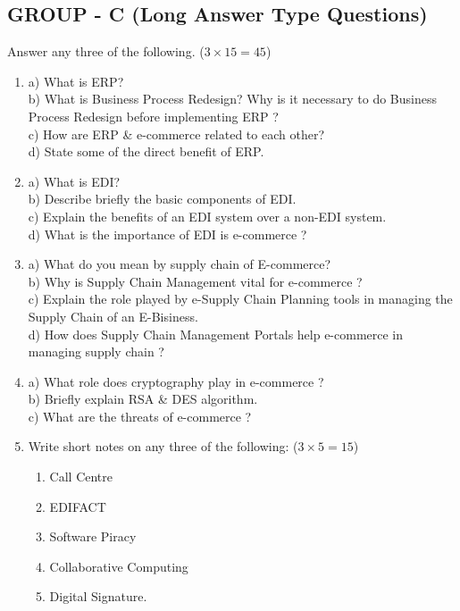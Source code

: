 \documentclass{article}
\begin{document}
\subsection*{GROUP - C (Long Answer Type Questions)}
Answer any three of the following. ($3 \times 15 = 45$)
\begin{enumerate}
    \item[7.] 
    a) What is ERP? \\
    b) What is Business Process Redesign? Why is it necessary to do Business Process Redesign before implementing ERP ? \\
    c) How are ERP \& e-commerce related to each other? \\
    d) State some of the direct benefit of ERP.
    \item[8.] 
    a) What is EDI? \\
    b) Describe briefly the basic components of EDI. \\
    c) Explain the benefits of an EDI system over a non-EDI system. \\
    d) What is the importance of EDI is e-commerce ?
    \item[9.] 
    a) What do you mean by supply chain of E-commerce? \\
    b) Why is Supply Chain Management vital for e-commerce ? \\
    c) Explain the role played by e-Supply Chain Planning tools in managing the Supply Chain of an E-Bisiness. \\
    d) How does Supply Chain Management Portals help e-commerce in managing supply chain ?
    \item[10.] 
    a) What role does cryptography play in e-commerce ? \\
    b) Briefly explain RSA \& DES algorithm. \\
    c) What are the threats of e-commerce ?
    \item[11.] Write short notes on any three of the following: ($3 \times 5 = 15$)
    \begin{enumerate}
        \item[a)] Call Centre
        \item[b)] EDIFACT
        \item[c)] Software Piracy
        \item[d)] Collaborative Computing
        \item[e)] Digital Signature.
    \end{enumerate}
\end{enumerate}
\end{document}
